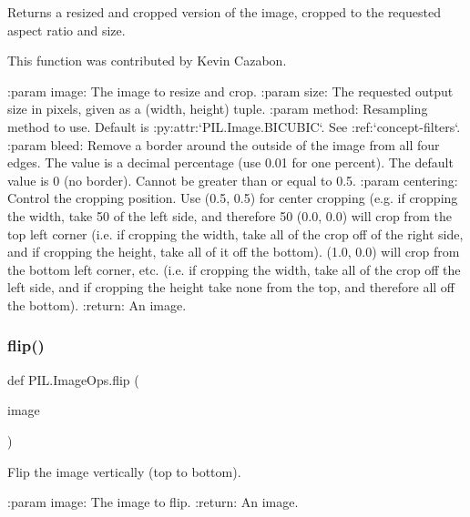 \begin{DoxyVerb}Returns a resized and cropped version of the image, cropped to the
requested aspect ratio and size.

This function was contributed by Kevin Cazabon.

:param image: The image to resize and crop.
:param size: The requested output size in pixels, given as a
             (width, height) tuple.
:param method: Resampling method to use. Default is
               :py:attr:`PIL.Image.BICUBIC`. See :ref:`concept-filters`.
:param bleed: Remove a border around the outside of the image from all
              four edges. The value is a decimal percentage (use 0.01 for
              one percent). The default value is 0 (no border).
              Cannot be greater than or equal to 0.5.
:param centering: Control the cropping position.  Use (0.5, 0.5) for
                  center cropping (e.g. if cropping the width, take 50%
                  of the left side, and therefore 50%
                  (0.0, 0.0) will crop from the top left corner (i.e. if
                  cropping the width, take all of the crop off of the right
                  side, and if cropping the height, take all of it off the
                  bottom).  (1.0, 0.0) will crop from the bottom left
                  corner, etc. (i.e. if cropping the width, take all of the
                  crop off the left side, and if cropping the height take
                  none from the top, and therefore all off the bottom).
:return: An image.
\end{DoxyVerb}
 \mbox{\label{namespacePIL_1_1ImageOps_ab61ed57d5fbd69996b56d4b86d807d0e}} 
\subsubsection{\texorpdfstring{flip()}{flip()}}
{\footnotesize\ttfamily def P\+I\+L.\+Image\+Ops.\+flip (\begin{DoxyParamCaption}\item[{}]{image }\end{DoxyParamCaption})}

\begin{DoxyVerb}Flip the image vertically (top to bottom).

:param image: The image to flip.
:return: An image.
\end{DoxyVerb}
 \mbox{\label{namespacePIL_1_1ImageOps_a0d321a776d6eb99f9e897b0778962c73}} 
